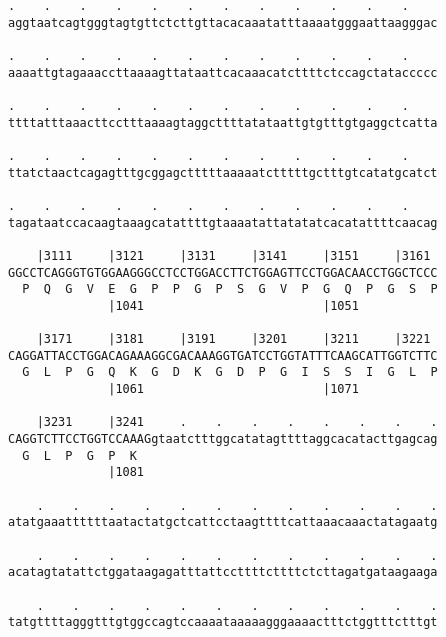 \documentclass{article}
\begin{document}
\begin{Verbatim}
.    .    .    .    .    .    .    .    .    .    .    .    
aggtaatcagtgggtagtgttctcttgttacacaaatatttaaaatgggaattaagggac
                                                            
.    .    .    .    .    .    .    .    .    .    .    .    
aaaattgtagaaaccttaaaagttataattcacaaacatcttttctccagctataccccc
                                                            
.    .    .    .    .    .    .    .    .    .    .    .    
ttttatttaaacttcctttaaaagtaggcttttatataattgtgtttgtgaggctcatta
                                                            
.    .    .    .    .    .    .    .    .    .    .    .    
ttatctaactcagagtttgcggagctttttaaaaatctttttgctttgtcatatgcatct
                                                            
.    .    .    .    .    .    .    .    .    .    .    .    
tagataatccacaagtaaagcatattttgtaaaatattatatatcacatattttcaacag
                                                            
    |3111     |3121     |3131     |3141     |3151     |3161 
GGCCTCAGGGTGTGGAAGGGCCTCCTGGACCTTCTGGAGTTCCTGGACAACCTGGCTCCC
  P  Q  G  V  E  G  P  P  G  P  S  G  V  P  G  Q  P  G  S  P
              |1041                         |1051           
  
    |3171     |3181     |3191     |3201     |3211     |3221 
CAGGATTACCTGGACAGAAAGGCGACAAAGGTGATCCTGGTATTTCAAGCATTGGTCTTC
  G  L  P  G  Q  K  G  D  K  G  D  P  G  I  S  S  I  G  L  P
              |1061                         |1071           
  
    |3231     |3241     .    .    .    .    .    .    .    .
CAGGTCTTCCTGGTCCAAAGgtaatctttggcatatagttttaggcacatacttgagcag
  G  L  P  G  P  K                                          
              |1081                                         
  
    .    .    .    .    .    .    .    .    .    .    .    .
atatgaaattttttaatactatgctcattcctaagttttcattaaacaaactatagaatg
                                                            
    .    .    .    .    .    .    .    .    .    .    .    .
acatagtatattctggataagagatttattccttttcttttctcttagatgataagaaga
                                                            
    .    .    .    .    .    .    .    .    .    .    .    .
tatgttttagggtttgtggccagtccaaaataaaaagggaaaactttctggtttctttgt
                                                            

\end{Verbatim}
\end{document}
